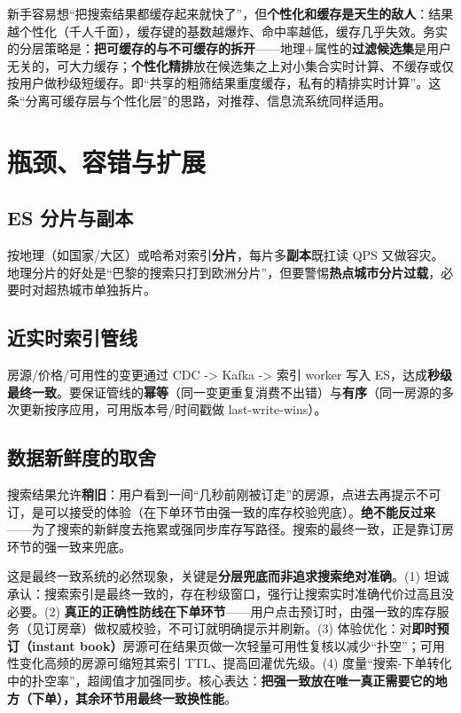 \begin{pitfall}[个性化与缓存的天然矛盾]
新手容易想“把搜索结果都缓存起来就快了”，但\textbf{个性化和缓存是天生的敌人}：结果越个性化（千人千面），缓存键的基数越爆炸、命中率越低，缓存几乎失效。务实的分层策略是：\textbf{把可缓存的与不可缓存的拆开}——地理+属性的\textbf{过滤候选集}是用户无关的，可大力缓存；\textbf{个性化精排}放在候选集之上对小集合实时计算、不缓存或仅按用户做秒级短缓存。即“共享的粗筛结果重度缓存，私有的精排实时计算”。这条“分离可缓存层与个性化层”的思路，对推荐、信息流系统同样适用。
\end{pitfall}

\section{瓶颈、容错与扩展}

\subsection{ES 分片与副本}

按地理（如国家/大区）或哈希对索引\textbf{分片}，每片多\textbf{副本}既扛读 QPS 又做容灾。地理分片的好处是“巴黎的搜索只打到欧洲分片”，但要警惕\textbf{热点城市分片过载}，必要时对超热城市单独拆片。

\subsection{近实时索引管线}

房源/价格/可用性的变更通过 CDC -> Kafka -> 索引 worker 写入 ES，达成\textbf{秒级最终一致}。要保证管线的\textbf{幂等}（同一变更重复消费不出错）与\textbf{有序}（同一房源的多次更新按序应用，可用版本号/时间戳做 last-write-wins）。

\subsection{数据新鲜度的取舍}

搜索结果允许\textbf{稍旧}：用户看到一间“几秒前刚被订走”的房源，点进去再提示不可订，是可以接受的体验（在下单环节由强一致的库存校验兜底）。\textbf{绝不能反过来}——为了搜索的新鲜度去拖累或强同步库存写路径。搜索的最终一致，正是靠订房环节的强一致来兜底。

\begin{followup}
这是最终一致系统的必然现象，关键是\textbf{分层兜底而非追求搜索绝对准确}。(1) 坦诚承认：搜索索引是最终一致的，存在秒级窗口，强行让搜索实时准确代价过高且没必要。(2) \textbf{真正的正确性防线在下单环节}——用户点击预订时，由强一致的库存服务（见订房章）做权威校验，不可订就明确提示并刷新。(3) 体验优化：对\textbf{即时预订（instant book）}房源可在结果页做一次轻量可用性复核以减少“扑空”；可用性变化高频的房源可缩短其索引 TTL、提高回灌优先级。(4) 度量“搜索-下单转化中的扑空率”，超阈值才加强同步。核心表达：\textbf{把强一致放在唯一真正需要它的地方（下单），其余环节用最终一致换性能}。
\end{followup}

